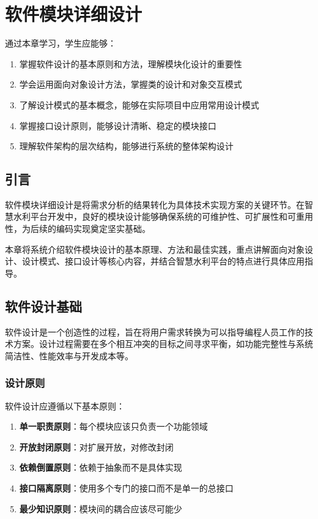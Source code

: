 \chapter{软件模块详细设计}

\begin{learningobjectives}
通过本章学习，学生应能够：
\begin{enumerate}
    \item 掌握软件设计的基本原则和方法，理解模块化设计的重要性
    \item 学会运用面向对象设计方法，掌握类的设计和对象交互模式
    \item 了解设计模式的基本概念，能够在实际项目中应用常用设计模式
    \item 掌握接口设计原则，能够设计清晰、稳定的模块接口
    \item 理解软件架构的层次结构，能够进行系统的整体架构设计
\end{enumerate}
\end{learningobjectives}

\section{引言}

软件模块详细设计是将需求分析的结果转化为具体技术实现方案的关键环节。在智慧水利平台开发中，良好的模块设计能够确保系统的可维护性、可扩展性和可重用性，为后续的编码实现奠定坚实基础。

本章将系统介绍软件模块设计的基本原理、方法和最佳实践，重点讲解面向对象设计、设计模式、接口设计等核心内容，并结合智慧水利平台的特点进行具体应用指导。

\section{软件设计基础}

软件设计是一个创造性的过程，旨在将用户需求转换为可以指导编程人员工作的技术方案。设计过程需要在多个相互冲突的目标之间寻求平衡，如功能完整性与系统简洁性、性能效率与开发成本等。

\subsection{设计原则}

软件设计应遵循以下基本原则：

\begin{enumerate}
    \item \textbf{单一职责原则}：每个模块应该只负责一个功能领域
    \item \textbf{开放封闭原则}：对扩展开放，对修改封闭
    \item \textbf{依赖倒置原则}：依赖于抽象而不是具体实现
    \item \textbf{接口隔离原则}：使用多个专门的接口而不是单一的总接口
    \item \textbf{最少知识原则}：模块间的耦合应该尽可能少
\end{enumerate}


